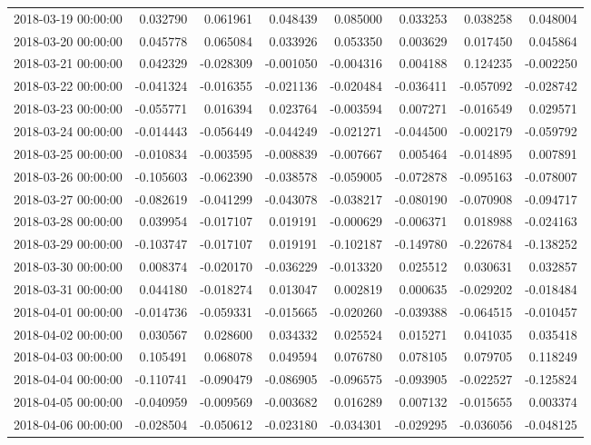\begin{tabular}{lrrrrrrr}
2018-03-19 00:00:00 & 0.032790 & 0.061961 & 0.048439 & 0.085000 & 0.033253 & 0.038258 & 0.048004 \\
2018-03-20 00:00:00 & 0.045778 & 0.065084 & 0.033926 & 0.053350 & 0.003629 & 0.017450 & 0.045864 \\
2018-03-21 00:00:00 & 0.042329 & -0.028309 & -0.001050 & -0.004316 & 0.004188 & 0.124235 & -0.002250 \\
2018-03-22 00:00:00 & -0.041324 & -0.016355 & -0.021136 & -0.020484 & -0.036411 & -0.057092 & -0.028742 \\
2018-03-23 00:00:00 & -0.055771 & 0.016394 & 0.023764 & -0.003594 & 0.007271 & -0.016549 & 0.029571 \\
2018-03-24 00:00:00 & -0.014443 & -0.056449 & -0.044249 & -0.021271 & -0.044500 & -0.002179 & -0.059792 \\
2018-03-25 00:00:00 & -0.010834 & -0.003595 & -0.008839 & -0.007667 & 0.005464 & -0.014895 & 0.007891 \\
2018-03-26 00:00:00 & -0.105603 & -0.062390 & -0.038578 & -0.059005 & -0.072878 & -0.095163 & -0.078007 \\
2018-03-27 00:00:00 & -0.082619 & -0.041299 & -0.043078 & -0.038217 & -0.080190 & -0.070908 & -0.094717 \\
2018-03-28 00:00:00 & 0.039954 & -0.017107 & 0.019191 & -0.000629 & -0.006371 & 0.018988 & -0.024163 \\
2018-03-29 00:00:00 & -0.103747 & -0.017107 & 0.019191 & -0.102187 & -0.149780 & -0.226784 & -0.138252 \\
2018-03-30 00:00:00 & 0.008374 & -0.020170 & -0.036229 & -0.013320 & 0.025512 & 0.030631 & 0.032857 \\
2018-03-31 00:00:00 & 0.044180 & -0.018274 & 0.013047 & 0.002819 & 0.000635 & -0.029202 & -0.018484 \\
2018-04-01 00:00:00 & -0.014736 & -0.059331 & -0.015665 & -0.020260 & -0.039388 & -0.064515 & -0.010457 \\
2018-04-02 00:00:00 & 0.030567 & 0.028600 & 0.034332 & 0.025524 & 0.015271 & 0.041035 & 0.035418 \\
2018-04-03 00:00:00 & 0.105491 & 0.068078 & 0.049594 & 0.076780 & 0.078105 & 0.079705 & 0.118249 \\
2018-04-04 00:00:00 & -0.110741 & -0.090479 & -0.086905 & -0.096575 & -0.093905 & -0.022527 & -0.125824 \\
2018-04-05 00:00:00 & -0.040959 & -0.009569 & -0.003682 & 0.016289 & 0.007132 & -0.015655 & 0.003374 \\
2018-04-06 00:00:00 & -0.028504 & -0.050612 & -0.023180 & -0.034301 & -0.029295 & -0.036056 & -0.048125 \\

\end{tabular}

